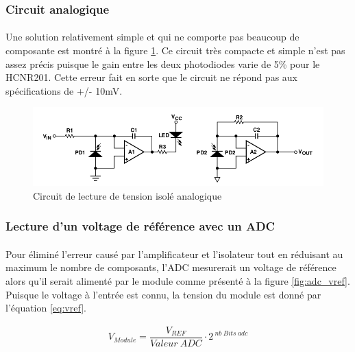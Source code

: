 	\subsubsection*{Circuit analogique}
	\paragraph*{}
	Une solution relativement simple et qui ne comporte pas beaucoup de composante est montré à la figure \ref{fig:HCNR201}. Ce circuit très compacte et simple n'est pas assez précis puisque le gain entre les deux photodiodes varie de 5\% pour le HCNR201. Cette erreur fait en sorte que le circuit ne répond pas aux spécifications de +/- 10mV.  
	
	\begin{figure}[H]
		\centering
		\includegraphics[scale = 0.5]{Images/Analogique.png}
		\caption{Circuit de lecture de tension isolé analogique \cite{HCNR201}}
		\label{fig:HCNR201}
	\end{figure}


	\newpage
	\subsubsection*{Lecture d'un voltage de référence avec un ADC}
	\paragraph*{}	
	Pour éliminé l'erreur causé par l'amplificateur et l'isolateur tout en réduisant au maximum le nombre de composants, l'ADC mesurerait un voltage de référence alors qu'il serait alimenté par le module comme présenté à la figure \ref{fig:adc_vref}. Puisque le voltage à l'entrée est connu, la tension du module est donné par l'équation \ref{eq:vref}.
	
	\begin{align}
		V_{Module} = \dfrac{V_{REF}}{Valeur~ADC} \cdot 2^{~nb~Bits~adc}
		\label{eq:vref}
	\end{align}
	

